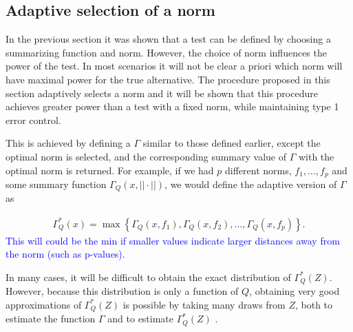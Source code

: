 \documentclass{article}
\newcommand{\norm}{f}
\newcommand{\rvv}{Z}
\newcommand{\distv}{Q}
\begin{document}
\subsection{Adaptive selection of a norm}
In the previous section it was shown that a test can be defined by choosing a summarizing function and norm. However, the choice of norm influences the power of the test. In most scenarios it will not be clear a priori which norm will have maximal power for the true alternative. The procedure proposed in this section adaptively selects a norm and it will be shown that this procedure achieves greater power than a test with a fixed norm, while maintaining type 1 error control.  

This is achieved by defining a $\Gamma$ similar to those defined earlier, except the optimal norm is selected, and the corresponding summary value of $\Gamma$ with the optimal norm is returned.  For example, if we had $p$ different norms, $\norm_1, \dots, \norm_p$ and some summary function $\Gamma_\distv(x, ||\cdot||)$, we would define the adaptive version of $\Gamma$ as

\begin{align*}
	\Gamma^*_\distv(x) = \max\left\{\Gamma_\distv(x, \norm_1), \Gamma_\distv(x, \norm_2), \dots, \Gamma_\distv(x, \norm_p)\right\}.
\end{align*}
\textcolor{blue}{This will could be the min if smaller values indicate larger distances away from the norm (such as p-values).}  

In many cases, it will be difficult to obtain the exact distribution of $\Gamma_\distv^*(\rvv)$. However, because this distribution is only a function of $\distv$, obtaining very good approximations of $\Gamma_\distv^*(\rvv)$ is possible by taking many draws from $\rvv$, both to estimate the function $\Gamma$ and to estimate $\Gamma^*_\distv(\rvv)$ .


\end{document}
